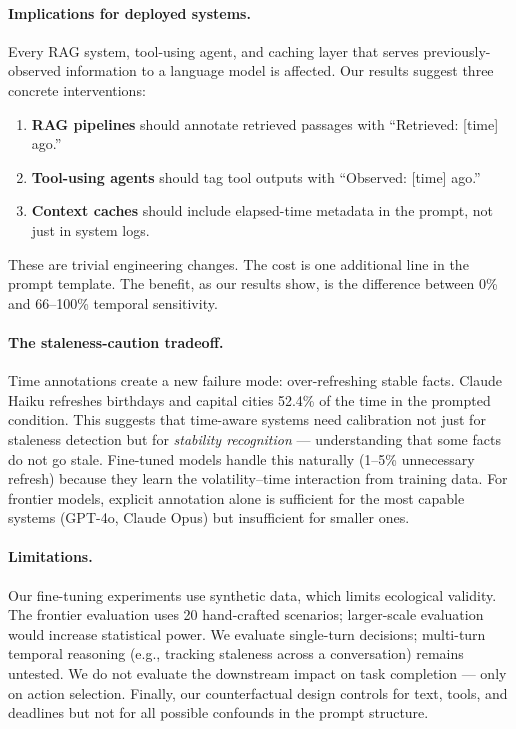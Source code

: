 \documentclass[11pt,a4paper]{article}
\begin{document}
\paragraph{Implications for deployed systems.}
Every RAG system, tool-using agent, and caching layer that serves previously-observed information to a language model is affected.
Our results suggest three concrete interventions:
\begin{enumerate}
    \item \textbf{RAG pipelines} should annotate retrieved passages with ``Retrieved: [time] ago.''
    \item \textbf{Tool-using agents} should tag tool outputs with ``Observed: [time] ago.''
    \item \textbf{Context caches} should include elapsed-time metadata in the prompt, not just in system logs.
\end{enumerate}
These are trivial engineering changes.
The cost is one additional line in the prompt template.
The benefit, as our results show, is the difference between 0\% and 66--100\% temporal sensitivity.

\paragraph{The staleness-caution tradeoff.}
Time annotations create a new failure mode: over-refreshing stable facts.
Claude Haiku refreshes birthdays and capital cities 52.4\% of the time in the prompted condition.
This suggests that time-aware systems need calibration not just for staleness detection but for \emph{stability recognition} --- understanding that some facts do not go stale.
Fine-tuned models handle this naturally (1--5\% unnecessary refresh) because they learn the volatility--time interaction from training data.
For frontier models, explicit annotation alone is sufficient for the most capable systems (GPT-4o, Claude Opus) but insufficient for smaller ones.

\paragraph{Limitations.}
Our fine-tuning experiments use synthetic data, which limits ecological validity.
The frontier evaluation uses 20 hand-crafted scenarios; larger-scale evaluation would increase statistical power.
We evaluate single-turn decisions; multi-turn temporal reasoning (e.g., tracking staleness across a conversation) remains untested.
We do not evaluate the downstream impact on task completion --- only on action selection.
Finally, our counterfactual design controls for text, tools, and deadlines but not for all possible confounds in the prompt structure.
\end{document}
